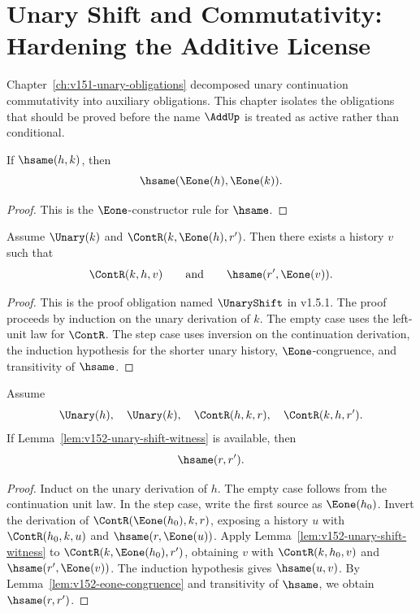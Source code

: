 
\chapter{Unary Shift and Commutativity: Hardening the Additive License}
\label{ch:v152-unary-shift-hardening}

Chapter~\ref{ch:v151-unary-obligations} decomposed unary continuation commutativity into auxiliary obligations. This chapter isolates the obligations that should be proved before the name \(\AddUp\) is treated as active rather than conditional.

\begin{lemma}
\label{lem:v152-eone-congruence}
If \(\hsame(h,k)\), then
\[
  \hsame(\Eone(h),\Eone(k)).
\]
\end{lemma}

\begin{proof}
This is the \(\Eone\)-constructor rule for \(\hsame\).
\end{proof}

\begin{lemma}
\label{lem:v152-unary-shift-witness}
Assume \(\Unary(k)\) and \(\ContR(k,\Eone(h),r')\). Then there exists a history \(v\) such that
\[
  \ContR(k,h,v)
  \qquad\text{and}\qquad
  \hsame(r',\Eone(v)).
\]
\end{lemma}

\begin{proof}
This is the proof obligation named \(\UnaryShift\) in v1.5.1. The proof proceeds by induction on the unary derivation of \(k\). The empty case uses the left-unit law for \(\ContR\). The step case uses inversion on the continuation derivation, the induction hypothesis for the shorter unary history, \(\Eone\)-congruence, and transitivity of \(\hsame\).
\end{proof}

\begin{theorem}
\label{thm:v152-unary-commutativity}
Assume
\[
  \Unary(h),\quad \Unary(k),\quad
  \ContR(h,k,r),\quad \ContR(k,h,r').
\]
If Lemma~\ref{lem:v152-unary-shift-witness} is available, then
\[
  \hsame(r,r').
\]
\end{theorem}

\begin{proof}
Induct on the unary derivation of \(h\). The empty case follows from the continuation unit law. In the step case, write the first source as \(\Eone(h_0)\). Invert the derivation of \(\ContR(\Eone(h_0),k,r)\), exposing a history \(u\) with \(\ContR(h_0,k,u)\) and \(\hsame(r,\Eone(u))\). Apply Lemma~\ref{lem:v152-unary-shift-witness} to \(\ContR(k,\Eone(h_0),r')\), obtaining \(v\) with \(\ContR(k,h_0,v)\) and \(\hsame(r',\Eone(v))\). The induction hypothesis gives \(\hsame(u,v)\). By Lemma~\ref{lem:v152-eone-congruence} and transitivity of \(\hsame\), we obtain \(\hsame(r,r')\).
\end{proof}

